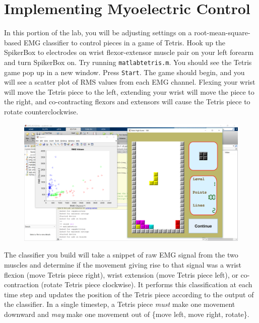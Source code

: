 \documentclass[10pt,oneside,a4paper]{article}
\begin{document}
\section{Implementing Myoelectric Control}
In this portion of the lab, you will be adjusting settings on a root-mean-square-based EMG classifier to control pieces in a game of Tetris. Hook up the SpikerBox to electrodes on wrist flexor-extensor muscle pair on your left forearm and turn SpikerBox on. Try running \texttt{matlabtetris.m}. You should see the Tetris game pop up in a new window. Press \texttt{Start}. The game should begin, and you will see a scatter plot of RMS values from each EMG channel. Flexing your wrist will move the Tetris piece to the left, extending your wrist will move the piece to the right, and co-contracting flexors and extensors will cause the Tetris piece to rotate counterclockwise. 
\begin{figure}[H]
\includegraphics[width=\textwidth]{tetris_game.PNG}
\end{figure}
The classifier you build will take a snippet of raw EMG signal from the two muscles and determine if the movement giving rise to that signal was a wrist flexion (move Tetris piece right), wrist extension (move Tetris piece left), or co-contraction (rotate Tetris piece clockwise). It performs this classification at each time step and updates the position of the Tetris piece according to the output of the classifier. In a single timestep, a Tetris piece \textit{must} make one movement downward and \textit{may} make one movement out of \{move left, move right, rotate\}.
\end{document}
